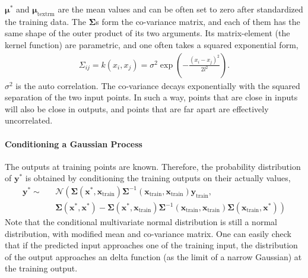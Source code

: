 $\mathbf{\mu}^*$ and $\mathbf{\mu}_{\textrm{textrm}}$ are the mean values and can be often set to zero after standardized the training data.
The $\mathbf{\Sigma}$s form the co-variance matrix, and each of them has the same shape of the outer product of its two arguments.
Its matrix-element (the kernel function) are parametric, and one often takes a squared exponential form,
\begin{eqnarray}
\Sigma_{ij} = k(x_i, x_j) = \sigma^2 \exp\left(-\frac{(x_i-x_j)^2}{2l^2}\right).
\end{eqnarray}
$\sigma^2$ is the auto correlation. 
The co-variance decays exponentially with the squared separation of the two input points.
In such a way, points that are close in inputs will also be close in outputs, and points that are far apart are effectively uncorrelated.

\paragraph{Conditioning a Gaussian Process} The outputs at training points are known.
Therefore, the probability distribution of $\mathbf{y}^*$ is obtained by conditioning the training outputs on their actually values,
\begin{eqnarray}
\mathbf{y}^* \sim &&\mathcal{N}\left(
\mathbf{\Sigma}(\mathbf{x}^*, \mathbf{x}_{\textrm{train}} )
\mathbf{\Sigma}^{-1}(\mathbf{x}_{\textrm{train}}, \mathbf{x}_{\textrm{train}} )\mathbf{y}_{\textrm{train}},\right.\\\nonumber
&&\left.
\mathbf{\Sigma}(\mathbf{x}^*, \mathbf{x}^*) - 
\mathbf{\Sigma}(\mathbf{x}^*, \mathbf{x}_{\textrm{train}} )
\mathbf{\Sigma}^{-1}(\mathbf{x}_{\textrm{train}}, \mathbf{x}_{\textrm{train}} )
\mathbf{\Sigma}(\mathbf{x}_{\textrm{train}},\mathbf{x}^*)
\right)
\end{eqnarray}
Note that the conditional multivariate normal distribution is still a normal distribution, with modified mean and co-variance matrix.
One can easily check that if the predicted input approaches one of the training input, the distribution of the output approaches an delta function (as the limit of a narrow Gaussian) at the training output.

